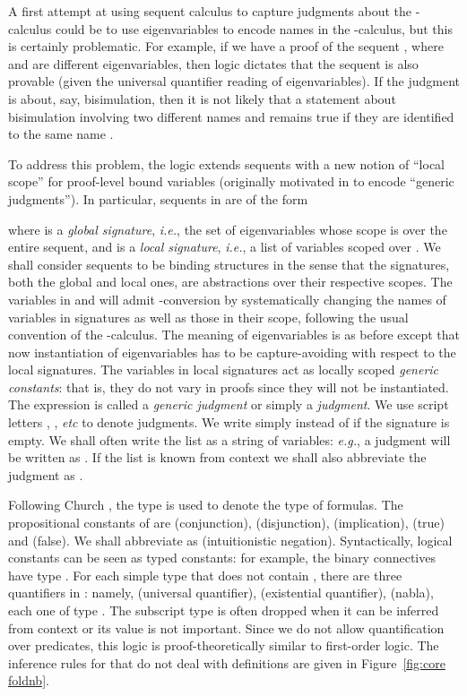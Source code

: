 \documentclass{acmtrans2m}
\newcommand{\ie}{{\em i.e.}}
\newcommand{\eg}{{\em e.g.}}
\begin{document}
A first attempt at using sequent calculus to capture judgments about
the -calculus could be to use eigenvariables to encode names in
the -calculus, but this is certainly problematic.  For example, if we
have a proof of the sequent , where  and  are
different eigenvariables, then logic dictates that the sequent
 is also provable (given the universal quantifier
reading of 
eigenvariables).  If the judgment  is about, say,
bisimulation, then it is not likely that a statement about
bisimulation involving two different names  and  remains true if
they are identified to the same name .

To address this problem, the logic  extends sequents with a
new notion of ``local scope'' for proof-level bound variables
(originally motivated in \cite{miller03lics} to encode ``generic
judgments'').  In particular, sequents in  are of the form

where  is a {\em global signature}, \ie, the set of eigenvariables 
whose scope is over the entire sequent, and  is a {\em local signature}, \ie, 
a list of variables scoped over . 
We shall consider sequents to be binding structures in the sense 
that the signatures, both the global and local
ones, are abstractions over their respective scopes.
The variables in 
 and  will admit -conversion by systematically
changing the names of variables in signatures as well as those in
their scope, following the usual convention of the -calculus.
The meaning of eigenvariables is as before except that 
now instantiation of eigenvariables has to be capture-avoiding with respect
to the local signatures.
The variables in local signatures act as locally scoped {\em generic constants}:
that is, they do not vary in proofs since they will not be instantiated.
The expression  is called a {\em generic judgment}
or simply a {\em judgment}. 
We use script letters , , {\em etc} to denote judgments.
We write simply  instead of  if the
signature  is empty. We shall often write 
the list  as a string of variables: \eg,
a judgment  will be written as .
If the list  is known from context we shall also abbreviate the
judgment as .

Following Church \citeyear{church40}, the type  is used to denote the
type of formulas.  The propositional constants of  are
 (conjunction),  (disjunction),  (implication),
 (true) and  (false). We shall abbreviate 
as  (intuitionistic negation).
Syntactically, logical constants can be seen as typed constants: for example, the binary connectives have
type .  For each simple type  that does not
contain , there are three quantifiers in : namely,
 (universal quantifier),  (existential
quantifier),  (nabla), each one of type .  The subscript type  is often dropped when it can be
inferred from context or its value is not important.  Since we do not
allow quantification over predicates, this logic is
proof-theoretically similar to first-order logic.
The inference rules for  that do not deal with
definitions are given in Figure~\ref{fig:core foldnb}.  
\end{document}
